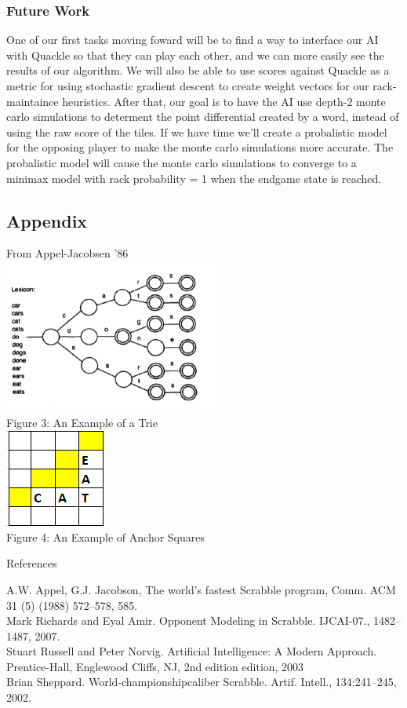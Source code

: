 \documentclass[12pt]{article}
\begin{document}
\subsubsection*{Future Work}
One of our first tasks moving foward will be to find a way to interface our AI with Quackle so that they can play each other, and we can more easily see the results of our algorithm. We will also be able to use scores against Quackle as a metric for using stochastic gradient descent to create weight vectors for our rack-maintaince heuristics. After that, our goal is to have the AI use depth-2 monte carlo simulations to determent the point differential created by a word, instead of using the raw score of the tiles. If we have time we'll create a probalistic model for the opposing player to make the monte carlo simulations more accurate. The probalistic model will cause the monte carlo simulations to converge to a minimax model with rack probability = 1 when the endgame state is reached.
\begin{center}
\section*{Appendix}

  From Appel-Jacobsen '86\\
  \includegraphics[scale=0.6]{trie}\\
Figure 3: An Example of a Trie \\
\includegraphics{anchorexample}\\
Figure 4: An Example of Anchor Squares

\vspace{ 8cm }
{\Large References} 
\end{center}
A.W. Appel, G.J. Jacobson, The world’s fastest Scrabble program, Comm. ACM 31 (5) (1988) 572–578, 585. \\
Mark Richards and Eyal Amir. Opponent Modeling in Scrabble. IJCAI-07., 1482–1487, 2007. \\
Stuart Russell and Peter Norvig. Artificial Intelligence: A Modern Approach. Prentice-Hall,
Englewood Cliffs, NJ, 2nd edition edition, 2003 \\
Brian Sheppard. World-championshipcaliber Scrabble. Artif. Intell., 134:241–245, 2002. \\
\end{document}
